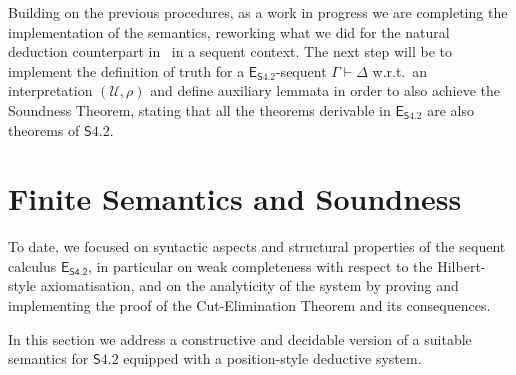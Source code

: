 \documentclass{article}
\newcommand{\seq}[2]{{#1} \vdash{} {#2}}
\newcommand{\logic}{\mathsf{S4.2}}
\newcommand{\calculus}{\mathsf{E}_{\logic}}
\newcommand{\eseq}{\mathsf{E}_{{\textsf{S4.2}}}}
\theoremstyle{definition}
\begin{document}
{{Building on the previous procedures, as a work in progress we are completing the implementation of the semantics, reworking what we did for the natural deduction counterpart in~\cite{Martini2024:S42NaturalDeduction} in a sequent context. The next step will be to implement the definition of truth for a $\calculus$-sequent $\seq{\Gamma}{\Delta}$ w.r.t.\ an interpretation $(\mathcal{U}, \rho)$ and define auxiliary lemmata in order to also achieve the Soundness Theorem, stating that all the theorems derivable in $\calculus$ are also theorems of $\logic$.%








}
}%


\section{Finite Semantics and Soundness}\label{sec:finite-semantics}
To date, we focused on syntactic aspects and structural properties of the sequent calculus $\eseq$, in particular on weak completeness with respect to the Hilbert-style axiomatisation, and on the analyticity of the system by proving and implementing the proof of the Cut-Elimination Theorem and its consequences.

In this section we address a constructive and decidable version of a suitable semantics for $\logic$ equipped with a position-style deductive system.
\end{document}
